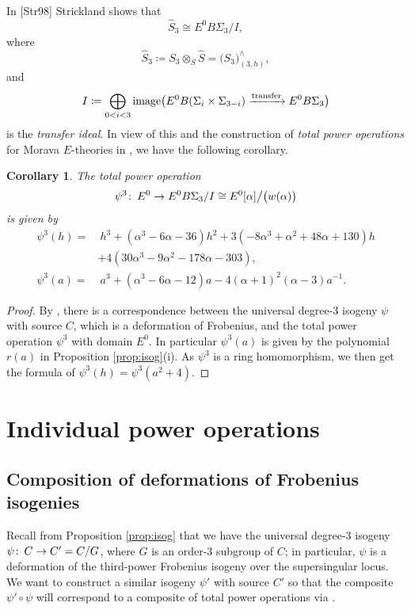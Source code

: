 \documentclass{gtpart}
\newtheorem{cor}[thm]{Corollary}
\theoremstyle{definition}
\theoremstyle{remark}
\def\co{\colon\thinspace}
\newcommand{\HS}{\widehat{S}}
\newcommand{\A}{\alpha}
\newcommand{\p}{\psi^3}
\begin{document}
In [Str98] Strickland shows that 
\[
 \HS_3 \cong E^0 B\Sigma_3 / I, 
\]
where 
\[
 \HS_3 \coloneqq S_3 \otimes_S \HS = \big( S_3 \big)_{(3,h)}^\wedge, 
\]
and
\begin{equation}
\label{transfer}
 I \coloneqq \bigoplus_{0<i<3} {\rm image} \big( E^0 B(\Sigma_i \times \Sigma_{3-i}) \xrightarrow{\rm transfer} E^0 B\Sigma_3 \big) 
\end{equation}
is the {\em transfer ideal}.  
In view of this and the construction of {\em total power operations} for Morava $E$-theories in \cite[3.23]{cong}, we have the following corollary.  
\begin{cor}
\label{cor:psi3}
 The total power operation 
 \[
  \p \co E^0 \to E^0 B\Sigma_3 / I \cong E^0 [\A] \big/ \big( w(\A) \big) 
 \]
 is given by 
 \begin{equation*}
 \begin{split}
  \p(h) = & ~ h^3 + (\A^3 - 6 \A - 36) h^2 + 3 (-8 \A^3 + \A^2 + 48 \A + 130) h \\
          & + 4 (30 \A^3 - 9 \A^2 - 178 \A - 303), \\
  \p(a) = & ~ a^3 + (\A^3 - 6 \A - 12) a - 4 (\A + 1)^2 (\A - 3) a^{-1}.  
 \end{split}
 \end{equation*}
\end{cor}
\begin{proof}
 By \cite[Theorem B]{cong}, there is a correspondence between the universal degree-3 isogeny $\psi$ with source $C$, which is a deformation of Frobenius, 
 and the total power operation $\p$ with domain $E^0$.  In particular $\p(a)$ is given by the polynomial $r(a)$ in Proposition \ref{prop:isog}\thinspace (i).  
 As $\p$ is a ring homomorphism, we then get the formula of $\p(h) = \p(a^2 + 4)$.  
\end{proof}


\section{Individual power operations}
\label{sec:individual}

\subsection{Composition of deformations of Frobenius isogenies}

Recall from Proposition \ref{prop:isog} that we have the universal degree-3 isogeny $\psi \co C \to C' = C/G$, where $G$ is an order-3 subgroup of $C$; 
in particular, $\psi$ is a deformation of the third-power Frobenius isogeny over the supersingular locus.  
We want to construct a similar isogeny $\psi'$ with source $C'$ 
so that the composite $\psi' \circ \psi$ will correspond to a composite of total power operations via \cite[Theorem B]{cong}.  
\end{document}
